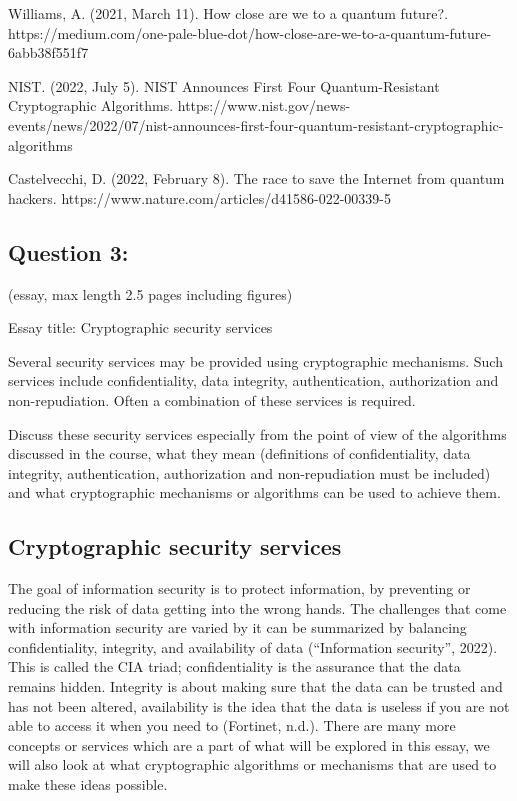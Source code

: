 \documentclass[11pt]{article}
\begin{document}
Williams, A. (2021, March 11). How close are we to a quantum future?.
https://medium.com/one-pale-blue-dot/how-close-are-we-to-a-quantum-future-6abb38f551f7

NIST. (2022, July 5). NIST Announces First Four Quantum-Resistant
Cryptographic Algorithms.
https://www.nist.gov/news-events/news/2022/07/nist-announces-first-four-quantum-resistant-cryptographic-algorithms

Castelvecchi, D. (2022, February 8). The race to save the Internet from
quantum hackers. https://www.nature.com/articles/d41586-022-00339-5

    \hypertarget{question-3}{%
\subsection{Question 3:}\label{question-3}}

(essay, max length 2.5 pages including figures)

Essay title: Cryptographic security services

Several security services may be provided using cryptographic
mechanisms. Such services include confidentiality, data integrity,
authentication, authorization and non-repudiation. Often a combination
of these services is required.

Discuss these security services especially from the point of view of the
algorithms discussed in the course, what they mean (definitions of
confidentiality, data integrity, authentication, authorization and
non-repudiation must be included) and what cryptographic mechanisms or
algorithms can be used to achieve them.

    \hypertarget{cryptographic-security-services}{%
\subsection{Cryptographic security
services}\label{cryptographic-security-services}}

The goal of information security is to protect information, by
preventing or reducing the risk of data getting into the wrong hands.
The challenges that come with information security are varied by it can
be summarized by balancing confidentiality, integrity, and availability
of data (``Information security'', 2022). This is called the CIA triad;
confidentiality is the assurance that the data remains hidden. Integrity
is about making sure that the data can be trusted and has not been
altered, availability is the idea that the data is useless if you are
not able to access it when you need to (Fortinet, n.d.). There are many
more concepts or services which are a part of what will be explored in
this essay, we will also look at what cryptographic algorithms or
mechanisms that are used to make these ideas possible.
\end{document}
